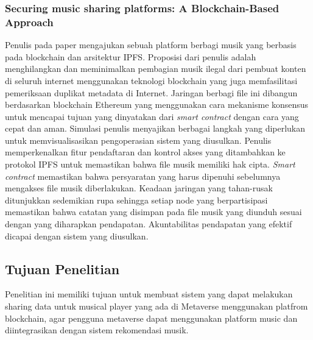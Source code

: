 \subsubsection{Securing music sharing platforms: A Blockchain-Based Approach}
Penulis pada paper \citep{adjei2021securing} mengajukan sebuah platform berbagi musik yang berbasis pada blockchain dan arsitektur IPFS. 
Proposisi dari penulis adalah menghilangkan dan meminimalkan pembagian musik ilegal dari pembuat konten di seluruh
internet menggunakan teknologi blockchain yang juga memfasilitasi pemeriksaan duplikat metadata di
Internet. Jaringan berbagi file ini dibangun berdasarkan blockchain Ethereum yang menggunakan
cara mekanisme konsensus untuk mencapai tujuan yang dinyatakan dari \emph{smart contract} dengan cara yang cepat dan aman.
Simulasi penulis menyajikan berbagai langkah yang diperlukan untuk memvisualisasikan pengoperasian sistem yang diusulkan. Penulis memperkenalkan fitur pendaftaran dan kontrol akses yang ditambahkan ke protokol IPFS untuk memastikan bahwa
file musik memiliki hak cipta. \emph{Smart contract} memastikan bahwa persyaratan yang harus dipenuhi sebelumnya
mengakses file musik diberlakukan. Keadaan jaringan yang tahan-rusak ditunjukkan sedemikian rupa sehingga
setiap node yang berpartisipasi memastikan bahwa catatan yang disimpan pada file musik yang diunduh sesuai dengan yang diharapkan
pendapatan. Akuntabilitas pendapatan yang efektif dicapai dengan sistem yang diusulkan.

\subsection{Tujuan Penelitian}

Penelitian ini memiliki tujuan untuk membuat sistem yang
dapat melakukan sharing data untuk musical player yang ada di Metaverse menggunakan platfrom blockchain, agar pengguna metaverse dapat menggunakan platform music dan diintegrasikan dengan sistem rekomendasi musik.